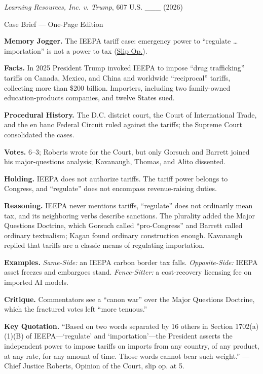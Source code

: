 \documentclass[12pt]{article}
\begin{document}
\begin{center}
{\Large \textit{Learning Resources, Inc. v. Trump}, 607 U.S. \_\_\_ (2026)\par}
\vspace{0.3em}
{\normalsize Case Brief --- One-Page Edition\par}
\end{center}

\textbf{Memory Jogger.} The IEEPA tariff case: emergency power to ``regulate \ldots{} importation'' is not a power to tax (\href{https://www.supremecourt.gov/opinions/25pdf/24-1287_4gcj.pdf}{Slip Op.}).

\textbf{Facts.} In 2025 President Trump invoked IEEPA to impose ``drug trafficking'' tariffs on Canada, Mexico, and China and worldwide ``reciprocal'' tariffs, collecting more than \$200 billion. Importers, including two family-owned education-products companies, and twelve States sued.

\textbf{Procedural History.} The D.C. district court, the Court of International Trade, and the en banc Federal Circuit ruled against the tariffs; the Supreme Court consolidated the cases.

\textbf{Votes.} 6--3; Roberts wrote for the Court, but only Gorsuch and Barrett joined his major-questions analysis; Kavanaugh, Thomas, and Alito dissented.

\textbf{Holding.} IEEPA does not authorize tariffs. The tariff power belongs to Congress, and ``regulate'' does not encompass revenue-raising duties.

\textbf{Reasoning.} IEEPA never mentions tariffs, ``regulate'' does not ordinarily mean tax, and its neighboring verbs describe sanctions. The plurality added the Major Questions Doctrine, which Gorsuch called ``pro-Congress'' and Barrett called ordinary textualism; Kagan found ordinary construction enough. Kavanaugh replied that tariffs are a classic means of regulating importation.

\textbf{Examples.} \emph{Same-Side:} an IEEPA carbon border tax falls. \emph{Opposite-Side:} IEEPA asset freezes and embargoes stand. \emph{Fence-Sitter:} a cost-recovery licensing fee on imported AI models.

\textbf{Critique.} Commentators see a ``canon war'' over the Major Questions Doctrine, which the fractured votes left ``more tenuous.''

\textbf{Key Quotation.} ``Based on two words separated by 16 others in Section 1702(a)(1)(B) of IEEPA---`regulate' and `importation'---the President asserts the independent power to impose tariffs on imports from any country, of any product, at any rate, for any amount of time. Those words cannot bear such weight.'' --- Chief Justice Roberts, Opinion of the Court, slip op. at 5.
\end{document}
